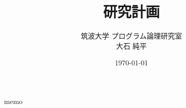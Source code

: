 \documentclass[11pt,a4paper,twocolumn]{jsarticle}
\title {\vspace{-1.2cm}研究計画}
\date{\today}
\author{筑波大学 プログラム論理研究室 \\ 大石 純平}
\theoremstyle{definition}
\begin{document}
\maketitle

 {memo}
\end{document}
